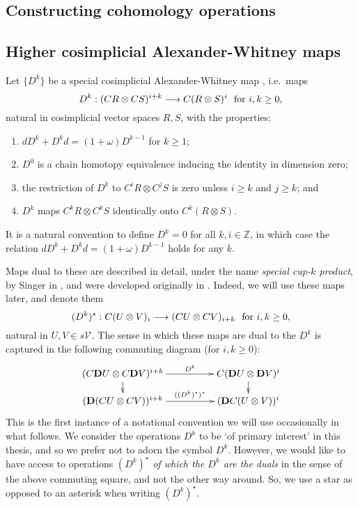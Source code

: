 \documentclass[11pt]{amsart} \renewcommand{\baselinestretch}{1.2}
\theoremstyle{plain}
\numberwithin{equation}{section} %
\theoremstyle{plain}
\numberwithin{equation}{chapter} %
\renewcommand{\to}{\longrightarrow}
\newcommand{\calV}{\mathcal{V}}
\newcommand{\vect}[2]{\calV^{#1}_{#2}}
\newcommand{\twist}{\omega}
\newcommand{\dual}{\mathbf{D}}
\newcommand{\SectionOrChapter}[1]{\section{\textbf{#1}}}
\newcommand{\SubsectionOrSection}[1]{\subsection{#1}}
\begin{document}
\begin{Constructing cohomology operations}
\SectionOrChapter{Constructing cohomology operations}
\label{sec:Constructing cohomology operations}
\label{Constructing cohomology operations}
\SubsectionOrSection{Higher cosimplicial Alexander-Whitney maps}
Let $\{D^k\}$ be a special cosimplicial Alexander-Whitney map \cite[Proposition 5.2]{turner_opns_and_sseqs_I.pdf}, i.e.\  maps
\[D^k:(CR\otimes CS)^{i+k}\to C(R\otimes S)^{i}\textup{\ \ for $i,k\geq0$},\]
natural in cosimplicial vector spaces $R,S$,
with the properties:
\begin{enumerate}
\setlength{\parindent}{.25in}
\item $dD^k+D^kd=(1+\twist)D^{k-1}$ for $k\geq1$;
\item $D^0$ is a chain homotopy equivalence inducing the identity in dimension zero;
\item the restriction of $D^k$ to $C^{i}R\otimes C^{j}S$ is zero unless $i\geq k$ and $j\geq k$; and
\item $D^k$ maps $C^{k}R\otimes C^{k}S$ identically onto $C^{k}(R\otimes S)$.
\end{enumerate}
It is a natural convention to define $D^k=0$ for all $k,i\in\mathbb{Z}$, in which case the relation $dD^k+D^kd=(1+\twist)D^{k-1}$ holds for any $k$.

Maps dual to these are described in detail, under the name \emph{special cup-$k$ product}, by Singer in \cite[Definitions 1.91 and 1.94]{MR2245560}, and were developed originally in \cite{DoldUber}. Indeed, we will use these maps later, and denote them
\[(D^k)^{\star}:C(U\otimes V)_{i}\to (CU\otimes CV)_{i+k}\textup{\ \ for $i,k\geq0$},\]
natural in $U,V\in s\vect{}{}$. The sense in which these maps are dual to the $D^k$ is captured in the following  commuting diagram (for $i,k\geq0$):
\[\xymatrix@R=4mm@C=17mm{
(C\dual U\otimes C\dual V)^{i+k}\ar[r]^-{D^k}
\ar[d]&%
C(\dual U\otimes\dual V)^{i}\ar[d]\\%
(\dual (CU\otimes CV))^{i+k}\ar[r]^-{((D^k)^{\star})^*}
&%
(\dual C(U\otimes V))^{i}%
}\]
This is the first instance of a notational convention we will use occasionally in what follows. We consider the operations $D^k$ to be `of primary interest' in this thesis,  and so we prefer not to adorn the symbol $D^k$. However, we would like to have access to operations $(D^k)^{\star}$ \emph{of which the $D^k$ are the duals} in the sense of the above commuting square, and not the other way around. So, we use a star as opposed to an asterisk when writing $(D^k)^{\star}$.


\end{Constructing cohomology operations}
\end{document}
